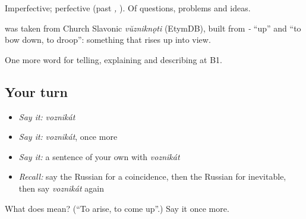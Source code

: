 Imperfective; perfective \emph{} (past \emph{, }). Of questions, problems and ideas.

\begin{cousinweb}
\textbf{} was taken from Church Slavonic \emph{vŭzniknǫti} (EtymDB), built from \emph{-} \textquotedblleft{}up\textquotedblright{} and \emph{} \textquotedblleft{}to bow down, to droop\textquotedblright{}: something that rises up into view.
\end{cousinweb}

\begin{grammarlens}[title={What you've built}]
One more word for telling, explaining and describing at B1.
\end{grammarlens}

\subsection*{Your turn}
\begin{itemize}
\raggedright
  \item \emph{Say it:} \emph{voznikát}
  \item \emph{Say it:} \emph{voznikát}, once more
  \item \emph{Say it:} a sentence of your own with \emph{voznikát}
  \item \emph{Recall:} say the Russian for a coincidence, then the Russian for inevitable, then say \emph{voznikát} again
\end{itemize}

\begin{tcolorbox}[breakable,colback=teal!4,colframe=teal!35!black,title={Before you move on}]
What does  mean? (\textquotedblleft{}To arise, to come up\textquotedblright{}.) Say it once more.
\end{tcolorbox}
